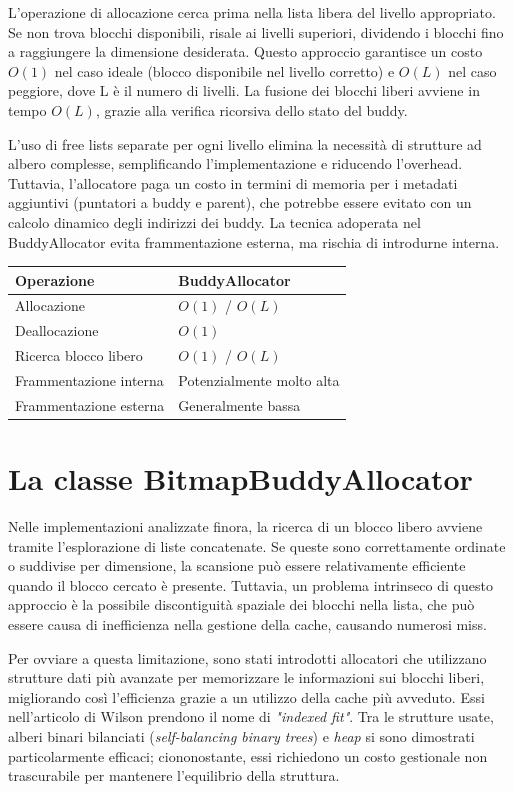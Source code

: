 L'operazione di allocazione cerca prima nella lista libera del livello appropriato. Se non trova blocchi disponibili, risale ai livelli superiori, dividendo i blocchi fino a raggiungere la dimensione desiderata. Questo approccio garantisce un costo $O(1)$ nel caso ideale (blocco disponibile nel livello corretto) e $O(L)$ nel caso peggiore, dove L è il numero di livelli. La fusione dei blocchi liberi avviene in tempo $O(L)$, grazie alla verifica ricorsiva dello stato del buddy.

L'uso di free lists separate per ogni livello elimina la necessità di strutture ad albero complesse, semplificando l'implementazione e riducendo l'overhead. Tuttavia, l'allocatore paga un costo in termini di memoria per i metadati aggiuntivi (puntatori a buddy e parent), che potrebbe essere evitato con un calcolo dinamico degli indirizzi dei buddy. La tecnica adoperata nel BuddyAllocator evita frammentazione esterna, ma rischia di introdurne interna.

\begin{center}
\begin{tabular}{|l|l|}
\hline
Operazione & BuddyAllocator \\
\hline
Allocazione & $O(1)$ / $O(L)$ \\
Deallocazione & $O(1)$ \\
Ricerca blocco libero & $O(1)$ / $O(L)$ \\
Frammentazione interna & Potenzialmente molto alta \\
Frammentazione esterna & Generalmente bassa \\
\hline
\end{tabular}
\end{center}

\section{La classe BitmapBuddyAllocator}
Nelle implementazioni analizzate finora, la ricerca di un blocco libero avviene tramite l'esplorazione di liste concatenate. Se queste sono correttamente ordinate o suddivise per dimensione, la scansione può essere relativamente efficiente quando il blocco cercato è presente. Tuttavia, un problema intrinseco di questo approccio è la possibile discontiguità spaziale dei blocchi nella lista, che può essere causa di inefficienza nella gestione della cache, causando numerosi miss.

Per ovviare a questa limitazione, sono stati introdotti allocatori che utilizzano strutture dati più avanzate per memorizzare le informazioni sui blocchi liberi, migliorando così l’efficienza grazie a un utilizzo della cache più avveduto. Essi nell’articolo di Wilson prendono il nome di \textit{"indexed fit"}. Tra le strutture usate, alberi binari bilanciati (\textit{self-balancing binary trees}) e \textit{heap} si sono dimostrati particolarmente efficaci; ciononostante, essi richiedono un costo gestionale non trascurabile per mantenere l’equilibrio della struttura.

